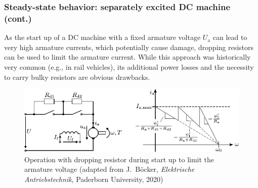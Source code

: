 \begin{frame}
	\frametitle{Steady-state behavior: separately excited DC machine (cont.)}
			As the start up of a DC machine with a fixed armature voltage $U_\mathrm{a}$ can lead to very high armature currents, which potentially cause damage, dropping resistors can be used to limit the armature current. While this approach was historically very common (e.g., in rail vehicles), its additional power losses and the necessity to carry bulky resistors are obvious drawbacks. 
		\begin{figure}
				\centering
				\includegraphics[scale=1.1]{fig/lec03/DC_machine_dropping_resistor.pdf}
				\caption{Operation with dropping resistor during start up to limit the armature voltage (adapted from J.~B\"ocker, \textit{Elektrische Antriebstechnik}, Paderborn University, 2020)}
				\label{fig:DC_machine_dropping_resistor}
		\end{figure}
\end{frame}

